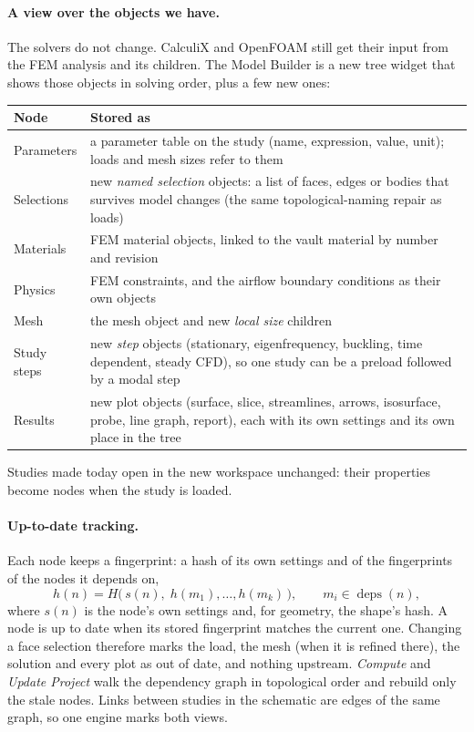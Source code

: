 \paragraph{A view over the objects we have.} The solvers do not change. CalculiX and OpenFOAM still get their input
from the FEM analysis and its children. The Model Builder is a new tree widget that shows those objects in solving
order, plus a few new ones:
\begin{center}
\small
\begin{tabularx}{\linewidth}{@{}lX@{}}
\toprule
Node & Stored as\\
\midrule
Parameters & a parameter table on the study (name, expression, value, unit); loads and mesh sizes refer to them\\
Selections & new \emph{named selection} objects: a list of faces, edges or bodies that survives model changes
             (the same topological-naming repair as loads)\\
Materials & FEM material objects, linked to the vault material by number and revision\\
Physics & FEM constraints, and the airflow boundary conditions as their own objects\\
Mesh & the mesh object and new \emph{local size} children\\
Study steps & new \emph{step} objects (stationary, eigenfrequency, buckling, time dependent, steady CFD), so one
              study can be a preload followed by a modal step\\
Results & new plot objects (surface, slice, streamlines, arrows, isosurface, probe, line graph, report), each
          with its own settings and its own place in the tree\\
\bottomrule
\end{tabularx}
\end{center}
Studies made today open in the new workspace unchanged: their properties become nodes when the study is loaded.

\paragraph{Up-to-date tracking.} Each node keeps a fingerprint: a hash of its own settings and of the fingerprints
of the nodes it depends on,
\[
  h(n)=H\bigl(\,s(n),\;h(m_1),\dots,h(m_k)\,\bigr),\qquad m_i\in\operatorname{deps}(n),
\]
where $s(n)$ is the node's own settings and, for geometry, the shape's hash. A node is up to date when its stored
fingerprint matches the current one. Changing a face selection therefore marks the load, the mesh (when it is
refined there), the solution and every plot as out of date, and nothing upstream. \emph{Compute} and
\emph{Update Project} walk the dependency graph in topological order and rebuild only the stale nodes. Links
between studies in the schematic are edges of the same graph, so one engine marks both views.

